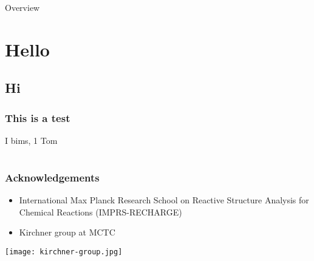 \documentclass[t,
aspectratio=169,			%
]{beamer}
\begin{document}
\begin{frame}{Overview}
	\tableofcontents
\end{frame}

%   
\section{Hello}
\subsection{Hi}

\begin{frame}
	\frametitle{This is a test}

	I bims, 1 Tom
\end{frame}

\appendix
\section{}              %

\begin{frame}
	\frametitle{Acknowledgements}

	\begin{itemize}
		\item International Max Planck Research School on Reactive Structure Analysis for Chemical Reactions (IMPRS-RECHARGE)
		\item Kirchner group at MCTC
	\end{itemize}


	\begin{center}
		\texttt{[image: kirchner-group.jpg]}
	\end{center}
\end{frame}
\end{document}
